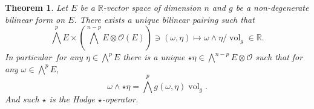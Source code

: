 \documentclass[8pt]{article}
\newtheorem{theorem}{Theorem} [section]
\DeclareMathOperator{\vol}{vol}
\newcommand{\R}[0]{\mathbb{R}}
\begin{document}
\begin{theorem}
  Let $E$ be a $\R$-vector space of dimension $n$ and $g$ be a non-degenerate bilinear form on $E$. %
  There exists a unique bilinear pairing such that 
  \begin{equation*}
    \bigwedge^p E\times\left(\bigwedge^{n-p}E\otimes \mathcal{O}(E)\right)\ni(\omega,\eta)\mapsto \omega\wedge\eta/\vol_g \in\R.
  \end{equation*}
  In particular\, for any $\eta\in\bigwedge^p E$ there is a unique $\star\eta\in\bigwedge^{n-p}E\otimes \mathcal{O}$ such that for any $\omega\in\bigwedge^pE$,
  \begin{equation*}
    \omega\wedge\star\eta = \bigwedge^pg(\omega,\eta)\vol_g.
  \end{equation*}
  And such $\star$ is the Hodge $\star$-operator.%
\end{theorem}
\end{document}
